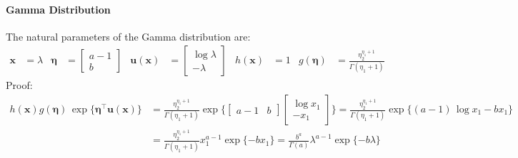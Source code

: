 \documentclass[11pt, a4paper]{scrartcl}
\newcommand{\transposed}{{\!\top\!}}
\renewcommand{\vec}[1]{\bm{#1}}
\begin{document}
			\paragraph{Gamma Distribution}
				The natural parameters of the Gamma distribution are:
				\begin{align}
					\vec{x} &= \lambda &
					\vec{\eta} &= \begin{bmatrix} a - 1 \\ b \end{bmatrix} &
					\vec{u}(\vec{x}) &= \begin{bmatrix} \log\lambda \\ -\lambda \end{bmatrix} &
					h(\vec{x}) &= 1 &
					g(\vec{\eta}) &= \frac{\eta_2^{\eta_1 + 1}}{\Gamma(\eta_1 + 1)}
				\end{align}
				Proof:
				\begin{align}
					h(\vec{x}) g(\vec{\eta}) \,\exp\Big\{ \vec{\eta}^\transposed \vec{u}(\vec{x}) \Big\}
						&= \frac{\eta_2^{\eta_1 + 1}}{\Gamma(\eta_1 + 1)} \exp\Bigg\{ \begin{bmatrix} a - 1 & b \end{bmatrix} \begin{bmatrix} \log x_1 \\ -x_1 \end{bmatrix} \Bigg\}
						 = \frac{\eta_2^{\eta_1 + 1}}{\Gamma(\eta_1 + 1)} \exp\big\{ (a - 1) \, \log x_1 - b x_1 \big\} \\
						&= \frac{\eta_2^{\eta_1 + 1}}{\Gamma(\eta_1 + 1)} x_1^{a - 1} \exp\{ -b x_1 \}
						 = \frac{b^a}{\Gamma(a)} \lambda^{a - 1} \exp\{ -b \lambda \}
				\end{align}
\end{document}
